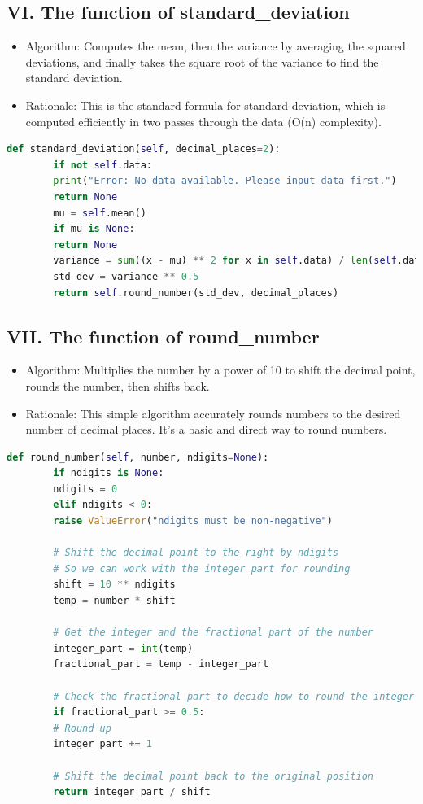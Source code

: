 \documentclass[english,12pt,a4paper]{report}
\begin{document}
	\subsection*{VI. The function of standard\_deviation}
	\begin{itemize}[leftmargin=*]
		\item Algorithm: Computes the mean, then the variance by averaging the squared deviations, and finally takes the square root of the variance to find the standard deviation.
		\item Rationale: This is the standard formula for standard deviation, which is computed efficiently in two passes through the data (O(n) complexity).
	\end{itemize}
	\begin{lstlisting}[language=Python, caption=Standard Deviation Method]
		def standard_deviation(self, decimal_places=2):
		if not self.data:
		print("Error: No data available. Please input data first.")
		return None
		mu = self.mean()
		if mu is None:
		return None
		variance = sum((x - mu) ** 2 for x in self.data) / len(self.data)
		std_dev = variance ** 0.5
		return self.round_number(std_dev, decimal_places)
	\end{lstlisting}
	
	
	\subsection*{VII. The function of round\_number}
	\begin{itemize}[leftmargin=*]
		\item Algorithm: Multiplies the number by a power of 10 to shift the decimal point, rounds the number, then shifts back.
		\item Rationale: This simple algorithm accurately rounds numbers to the desired number of decimal places. It's a basic and direct way to round numbers.
	\end{itemize}
	\begin{lstlisting}[language=Python, caption=Round Number Method]
		def round_number(self, number, ndigits=None):
		if ndigits is None:
		ndigits = 0
		elif ndigits < 0:
		raise ValueError("ndigits must be non-negative")
		
		# Shift the decimal point to the right by ndigits
		# So we can work with the integer part for rounding
		shift = 10 ** ndigits
		temp = number * shift
		
		# Get the integer and the fractional part of the number
		integer_part = int(temp)
		fractional_part = temp - integer_part
		
		# Check the fractional part to decide how to round the integer part
		if fractional_part >= 0.5:
		# Round up
		integer_part += 1
		
		# Shift the decimal point back to the original position
		return integer_part / shift
	\end{lstlisting}
	
\end{document}
